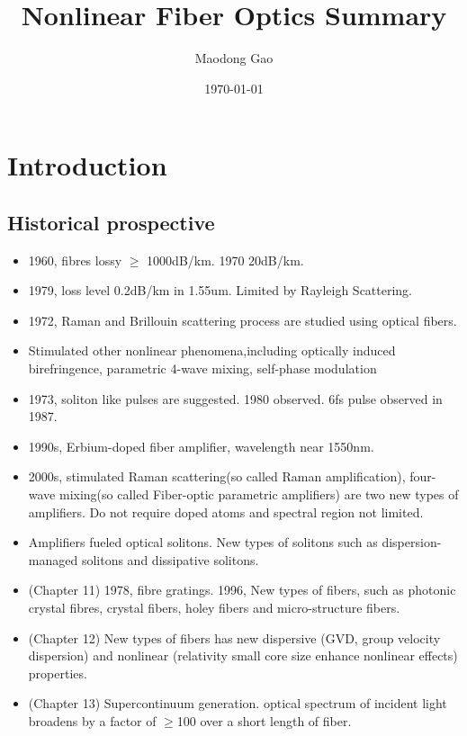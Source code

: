 \documentclass[12pt]{extarticle}
\title{Nonlinear Fiber Optics\cite{agrawal_nonlinear_2007} Summary}
\author{Maodong Gao}
\date{\today}
\numberwithin{equation}{section}
\numberwithin{figure}{section}
\numberwithin{table}{section}
\newcommand{\<}{\langle}
\renewcommand{\>}{\rangle}
\theoremstyle{definition}
\begin{document}
\maketitle
\tableofcontents
\newpage


\section{Introduction}
    \subsection{Historical prospective}
    
        \begin{itemize}
            \item 1960, fibres lossy $\geq$ 1000dB/km. 1970 20dB/km.
            \item 1979, loss level 0.2dB/km in 1.55um. Limited by Rayleigh Scattering.
            \item 1972, Raman and Brillouin scattering process are studied using optical fibers.
            \item Stimulated other nonlinear phenomena,including optically induced birefringence, parametric 4-wave mixing, self-phase modulation
            \item 1973, soliton like pulses are suggested. 1980 observed. 6fs pulse observed in 1987.
            \item 1990s, Erbium-doped fiber amplifier, wavelength near 1550nm.
            \item 2000s, stimulated Raman scattering(so called Raman amplification), four-wave mixing(so called Fiber-optic parametric amplifiers) are two new types of amplifiers. Do not require doped atoms and spectral region not limited.
            \item Amplifiers fueled optical solitons. New types of solitons such as dispersion-managed solitons and dissipative solitons.
            \item (Chapter 11) 1978, fibre gratings. 1996, New types of fibers, such as photonic crystal fibres, crystal fibers,  holey fibers and micro-structure fibers.
            \item (Chapter 12) New types of fibers has new dispersive (GVD, group velocity dispersion) and nonlinear (relativity small core size enhance nonlinear effects) properties.
            \item (Chapter 13) Supercontinuum generation. optical spectrum of incident light broadens by a factor of $\geq$100 over a short length of fiber.
        \end{itemize}
    
\end{document}
